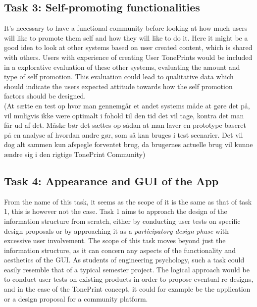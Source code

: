 \subsection{Task 3: Self-promoting functionalities}
\label{Task3}
It's necessary to have a functional community before looking at how much users will like to promote them self and how they will like to do it. Here it might be a good idea to look at other systems based on user created content, which is shared with others. Users with experience of creating User TonePrints would be included in a explorative evaluation of these other systems, evaluating the amount and type of self promotion. This evaluation could lead to qualitative data which should indicate the users expected attitude towards how the self promotion factors should be designed.\\
(At sætte en test op hvor man gennemgår et andet systems måde at gøre det på, vil muligvis ikke være optimalt i fohold til den tid det vil tage, kontra det man får ud af det. Måske bør det sættes op sådan at man laver en prototype baseret på en analyse af hvordan andre gør, som så kan bruges i test scenarier. Det vil dog alt sammen kun afspegle forventet brug, da brugernes actuelle brug vil kunne ændre sig i den rigtige TonePrint Community)


\subsection{Task 4: Appearance and GUI of the App}
\label{Task4}
From the name of this task, it seems as the scope of it is the same as that of task 1, this is however not the case. Task 1 aims to approach the design of the information structure from scratch, either by conducting user tests on specific design proposals or by approaching it as a \textit{participatory design phase} with excessive user involvement. The scope of this task moves beyond just the information structure, as it can concern any aspects of the functionality and aesthetics of the GUI. As students of engineering psychology, such a task could easily resemble that of a typical semester project. The logical approach would be to conduct user tests on existing products in order to propose eventual re-designs, and in the case of the TonePrint concept, it could for example be the application or a design proposal for a community platform.\\

